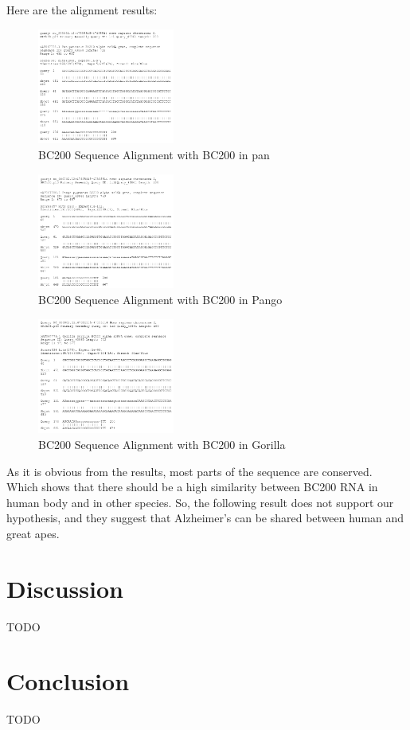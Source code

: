 \documentclass[conference]{IEEEtran}
\begin{document}
Here are the alignment results:

\begin{figure}
  \centering
  \includegraphics[width=0.4\textwidth]{figs/TK1PBYHT114-Alignment-2-page-1.png}
  \caption{BC200 Sequence Alignment with BC200 in pan}
\end{figure}

\begin{figure}
  \centering
  \includegraphics[width=0.4\textwidth]{figs/TK1PBYHT114-Alignment-3-page-1.png}
  \caption{BC200 Sequence Alignment with BC200 in Pango}
\end{figure}

\begin{figure}
  \centering
  \includegraphics[width=0.4\textwidth]{figs/TK1PBYHT114-Alignment-page-1.png}
  \caption{BC200 Sequence Alignment with BC200 in Gorilla}
\end{figure}

As it is obvious from the results, most parts of the sequence are conserved. 
Which shows that there should be a high similarity between BC200 RNA in human body and in other species. 
So, the following result does not support our hypothesis, and they suggest that Alzheimer’s can be shared between human and great apes.

\section{Discussion}\label{sec:discussion}
TODO

\section{Conclusion}\label{sec:conclusion}
TODO



\end{document}
